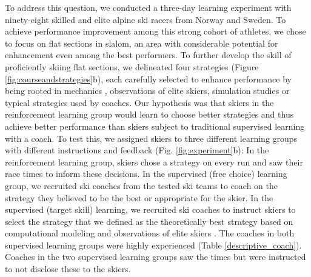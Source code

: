 \documentclass[pdflatex,sn-mathphys-num]{sn-jnl}%
\theoremstyle{thmstyleone}%
\theoremstyle{thmstyletwo}%
\theoremstyle{thmstylethree}%
\begin{document}
To address this question, we conducted a three-day learning experiment with ninety-eight skilled and elite alpine ski racers from Norway and Sweden. To achieve performance improvement among this strong cohort of athletes, we chose to focus on flat sections in slalom, an area with considerable potential for enhancement even among the best performers\cite{supej_new_2011}. To further develop the skill of proficiently skiing flat sections, we delineated four strategies (Figure \ref{fig:courseandstrategies}b), each carefully selected to enhance performance by being rooted in mechanics \cite{lind_physics_2013}, observations of elite skiers\cite{magelssen_is_2022, reid_kinematic_2010}, simulation studies \cite{mote_accelerations_1983, luginbuhl_identification_2023} or typical strategies used by coaches. Our hypothesis was that skiers in the reinforcement learning group would learn to choose better strategies and thus achieve better performance than skiers subject to traditional supervised learning with a coach. To test this, we assigned skiers to three different learning groups with different instructions and feedback (Fig. \ref{fig:experiment}b): In the reinforcement learning group, skiers chose a strategy on every run and saw their race times to inform these decisions. In the supervised (free choice) learning group, we recruited ski coaches from the tested ski teams to coach on the strategy they believed to be the best or appropriate for the skier. In the supervised (target skill) learning, we recruited ski coaches to instruct skiers to select the strategy that we defined as the theoretically best strategy based on computational modeling \cite{lind_physics_2013, mote_accelerations_1983} and observations of elite skiers \cite{reid_alpine_2020, magelssen_is_2022}. The coaches in both supervised learning groups were highly experienced (Table \ref{descriptive_coach}). Coaches in the two supervised learning groups saw the times but were instructed to not disclose these to the skiers. 
\end{document}
